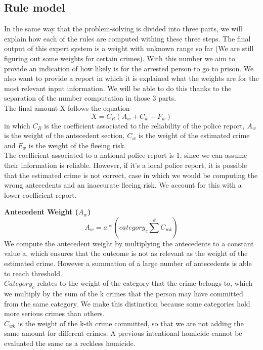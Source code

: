 \documentclass{article}
\begin{document}
\subsection{Rule model}
In the same way that the problem-solving is divided into three parts, we will explain how each of the rules are computed withing these three steps. The final output of this expert system is a weight with unknown range so far (We are still figuring out some weights for certain crimes). With this number we aim to provide an indication of how likely is for the arrested person to go to prison. We also want to provide a report in which it is explained what the weights are for the most relevant input information. We will be able to do this thanks to the separation of the number computation in those 3 parts. \\
The final amount X follows the equation 
\begin{equation}
    X = C_R(A_w+ C_w+F_w)
\end{equation}
in which $C_R$ is the coefficient associated to the reliability of the police report, $A_w$ is the weight of the antecedent section, $C_w$ is the weight of the estimated crime and $F_w$ is the weight of the fleeing risk.\\
The coefficient associated to a national police report is 1, since we can assume their information is reliable. However, if it's a local police report, it is possible that the estimated crime is not correct, case in which we would be computing the wrong antecedents and an inaccurate fleeing risk. We account for this with a lower coefficient report.

\textbf{Antecedent Weight ($A_w$)}
\begin{equation}
    A_w= a * (category_c \sum^{k} C_{wk})
\end{equation}
We compute the antecedent weight by multiplying the antecedents to a constant value a, which ensures that the outcome is not as relevant as the weight of the estimated crime. However a summation of a large number of antecedents is able to reach threshold.\\
$Category_c$ relates to the weight of the category that the crime belongs to, which we multiply by the sum of the k crimes that the person may have committed from the same category. We make this distinction because some categories hold more serious crimes than others. \\
$C_{wk}$ is the weight of the k-th crime committed, so that we are not adding the same amount for different crimes. A previous intentional homicide cannot be evaluated the same as a reckless homicide. \\
\end{document}
